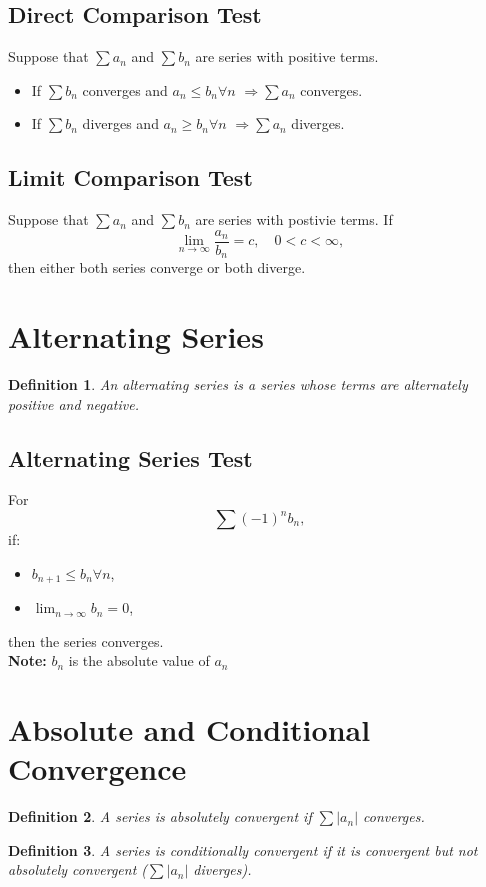 \documentclass[11pt]{article}
\theoremstyle{mydef}
\newtheorem{definition}{Definition}
\begin{document}
\subsection*{Direct Comparison Test}
Suppose that $\sum a_n$ and $\sum b_n$ are series with positive terms.

\begin{itemize}
\item If $\sum b_n$ converges and $a_n\leq b_n  \forall n$ $\Rightarrow \sum a_n$ converges.
\item If $\sum b_n$ diverges and $a_n\geq b_n \forall n$ $\Rightarrow \sum a_n$ diverges.
\end{itemize}

\subsection*{Limit Comparison Test}
Suppose  that $\sum a_n$ and $\sum b_n$ are series with postivie terms. If 
\[
\lim_{n\to\infty}\frac{a_n}{b_n}=c,
\quad 0<c<\infty,
\]
then either both series converge or both diverge.

\section*{Alternating Series}

\begin{definition}
    An \textit{alternating series} is a series whose terms are alternately positive and negative.
\end{definition}

\subsection*{Alternating Series Test}
For
\[
\sum (-1)^n b_n,
\]
if:
\begin{itemize}
\item $b_{n+1}\leq b_n \forall n$,
\item $\lim_{n \to \infty} b_n = 0$,
\end{itemize}
then the series converges.\\
\textbf{Note:} $b_n$ is the absolute value of $a_n$


\section*{Absolute and Conditional Convergence}

\begin{definition}
    A series is \textit{absolutely convergent} if $\sum |a_n|$ converges.
\end{definition}
\begin{definition}
    A series is \textit{conditionally convergent} if it is convergent but not absolutely convergent ($\sum |a_n|$ diverges).
\end{definition}
\end{document}
